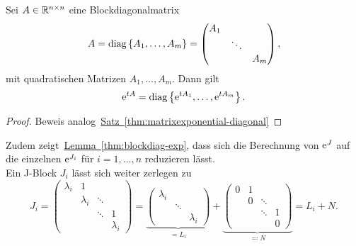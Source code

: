 \begin{lemma}\label{thm:blockdiag-exp}
    Sei $A \in \mathbb{R}^{n \times n}$ eine Blockdiagonalmatrix
    \begin{equation*}
        A = \operatorname{diag}\left\{A_1,\dots,A_m\right\}
        = \begin{pmatrix}
                A_1 &        & \\
                    & \ddots & \\
                    &        & A_m
        \end{pmatrix},
    \end{equation*}
    mit quadratischen Matrizen $A_1, \dots, A_m$.
    Dann gilt
    \begin{equation*}
        \mathrm{e}^{t A} = \operatorname{diag}\left\{ \mathrm{e}^{t A_1}, \dots,\mathrm{e}^{t A_m} \right\}.
    \end{equation*}
\end{lemma}

\begin{proof}
    Beweis analog~\hyperref[thm:matrixexponential-diagonal]{Satz~\ref*{thm:matrixexponential-diagonal}}
\end{proof}

Zudem zeigt~\hyperref[thm:blockdiag-exp]{Lemma~\ref*{thm:blockdiag-exp}},
dass sich die Berechnung von $\mathrm{e}^J$ auf die einzelnen $\mathrm{e}^{J_i}$ für $i = 1,\dots,n$ reduzieren lässt.\\
Ein J-Block $J_i$ lässt sich weiter zerlegen zu
\begin{equation*}
    J_i = \begin{pmatrix}
              \lambda_i & 1         &        & \\
                        & \lambda_i & \ddots & \\
                        &           & \ddots & 1 \\
                        &           &        & \lambda_i
    \end{pmatrix}
    = \underbrace{\begin{pmatrix}
        \lambda_i &        & \\
                  & \ddots & \\
                  &        & \lambda_i
    \end{pmatrix}}_{= L_i}
    + \underbrace{\begin{pmatrix}
          0 & 1 &        & \\
            & 0 & \ddots & \\
            &   & \ddots & 1 \\
            &   &        & 0
    \end{pmatrix}}_{\eqqcolon N}
    = L_i + N.
\end{equation*}

